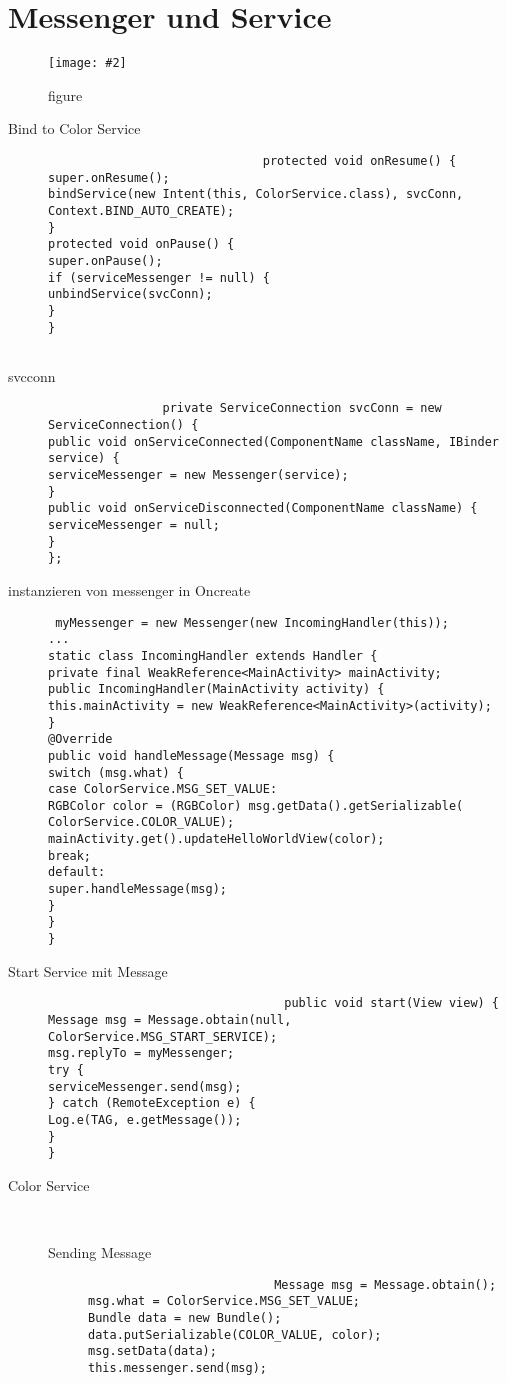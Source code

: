 \documentclass[a4paper,10pt,titlepage=false]{scrreprt}
\newcommand{\pic}[2][figure]{\begin{figure}[h]
 \centering
 \texttt{[image: \#2]}
 \caption{#1}
\end{figure}
}
\begin{document}
\section{Messenger und Service}
\pic{mhandler.png}

\begin{description}
\item[Bind to Color Service] \begin{lstlisting}
                              protected void onResume() {
super.onResume();
bindService(new Intent(this, ColorService.class), svcConn,
Context.BIND_AUTO_CREATE);
}
protected void onPause() {
super.onPause();
if (serviceMessenger != null) {
unbindService(svcConn);
}
}


                             \end{lstlisting}
\item[svcconn] \begin{lstlisting}
                private ServiceConnection svcConn = new ServiceConnection() {
public void onServiceConnected(ComponentName className, IBinder service) {
serviceMessenger = new Messenger(service);
}
public void onServiceDisconnected(ComponentName className) {
serviceMessenger = null;
}
};

               \end{lstlisting}
\item[instanzieren von messenger in Oncreate]
\begin{lstlisting}
 myMessenger = new Messenger(new IncomingHandler(this));
...
static class IncomingHandler extends Handler {
private final WeakReference<MainActivity> mainActivity;
public IncomingHandler(MainActivity activity) {
this.mainActivity = new WeakReference<MainActivity>(activity);
}
@Override
public void handleMessage(Message msg) {
switch (msg.what) {
case ColorService.MSG_SET_VALUE:
RGBColor color = (RGBColor) msg.getData().getSerializable(
ColorService.COLOR_VALUE);
mainActivity.get().updateHelloWorldView(color);
break;
default:
super.handleMessage(msg);
}
}
}

\end{lstlisting}
\item[Start Service mit Message] \begin{lstlisting}
                                 public void start(View view) {
Message msg = Message.obtain(null, ColorService.MSG_START_SERVICE);
msg.replyTo = myMessenger;
try {
serviceMessenger.send(msg);
} catch (RemoteException e) {
Log.e(TAG, e.getMessage());
}
}

                                \end{lstlisting}
\item[Color Service] \hfill \\
\begin{description}
 \item [Sending Message] \begin{lstlisting}
                          Message msg = Message.obtain();
msg.what = ColorService.MSG_SET_VALUE;
Bundle data = new Bundle();
data.putSerializable(COLOR_VALUE, color);
msg.setData(data);
this.messenger.send(msg);


\end{lstlisting}
\end{description}
\end{description}
\end{document}
